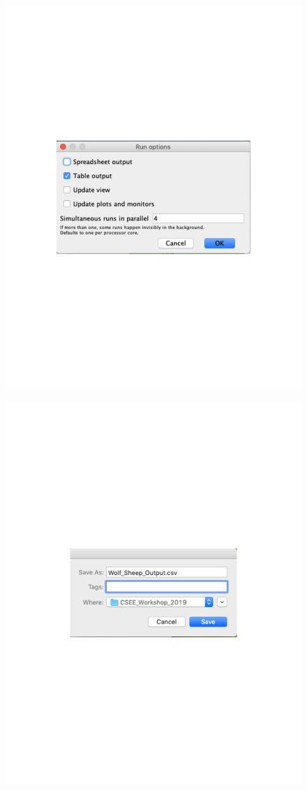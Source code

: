 \documentclass[11pt, oneside]{article}   	%
\begin{document}
\begin{enumerate}
\begin{figure}[th!]
\centering
\begin{minipage}{.5\textwidth}
  \centering
  \includegraphics[width=.8\linewidth]{table}
  \label{fig:test1}
\end{minipage}%
\begin{minipage}{.5\textwidth}
  \centering
  \includegraphics[width=.7\linewidth]{save}

\end{minipage}
\end{figure}
\end{enumerate}
\end{document}

